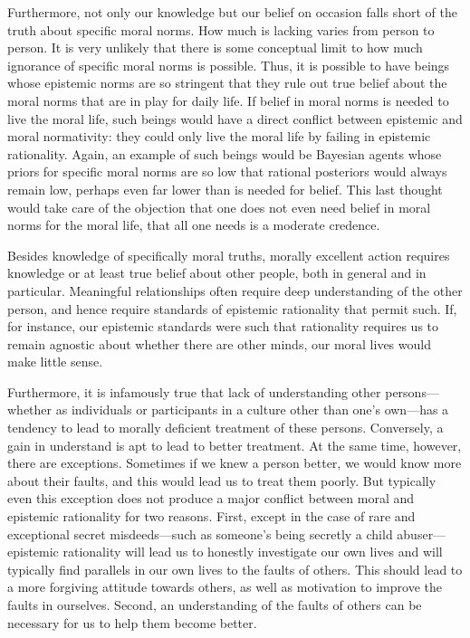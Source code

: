 Furthermore, not only our knowledge but our belief on occasion falls short of the truth about specific moral norms.
How much is lacking varies from person to person. It is very unlikely that there is some conceptual limit to how much
ignorance of specific moral norms is possible. Thus, it is possible to have beings whose epistemic norms are so stringent
that they rule out true belief about the moral norms that are in play for daily life. If belief in moral norms is needed 
to live the moral life, such beings would have a direct conflict between epistemic and moral normativity: they could only 
live the moral life by failing in epistemic rationality. Again, an example of such beings would be Bayesian agents whose
priors for specific moral norms are so low that rational posteriors would always remain low, perhaps even far lower than 
is needed for belief. This last thought would take care of the objection that one does not even need belief in moral norms for the moral life, that all one needs is a moderate credence. 

Besides knowledge of specifically moral truths, morally excellent action requires knowledge or at least true belief about 
other people, both in general and in particular. Meaningful relationships often require deep understanding of the other 
person, and hence require standards of epistemic rationality that permit such. If, for instance, our epistemic standards
were such that rationality requires us to remain agnostic about whether there are other minds, our moral lives would 
make little sense. 

Furthermore, it is infamously true that lack of understanding other persons---whether as individuals or participants in 
a culture other than one's own---has a tendency to lead to morally deficient treatment of these persons. Conversely, a 
gain in understand is apt to lead to better treatment. At the same time, however, there are exceptions. Sometimes if we 
knew a person better, we would know more about their faults, and this would lead us to treat them poorly. But typically 
even this exception does not produce a major conflict between moral and epistemic rationality for two reasons. First, 
except in the case of rare and exceptional secret misdeeds---such as someone's being secretly a child 
abuser---epistemic rationality will lead us to honestly investigate our own lives and will typically find parallels in 
our own lives to the faults of others. This should lead to a more forgiving attitude towards others, as well as motivation
to improve the faults in ourselves. Second, an understanding of the faults of others can be necessary for us to help them 
become better.

